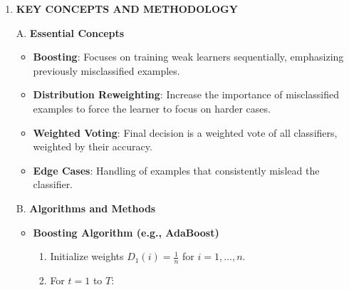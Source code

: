 \documentclass[
  12pt,
]{report}
\providecommand{\tightlist}{%
  \setlength{\itemsep}{0pt}\setlength{\parskip}{0pt}}
\begin{document}
\begin{enumerate}
\begin{itemize}
    \begin{itemize}
    \tightlist
    \item
      \textbf{Error Weighting}: Adjusting distribution \(D_t(x_i) = \frac{D_{t-1}(x_i) \cdot e^{-\alpha_t \cdot y_i \cdot h_t(x_i)}}{Z_t}\), where \(\alpha_t = \frac{1}{2} \ln\left(\frac{1-\epsilon_t}{\epsilon_t}\right)\).
    \end{itemize}
  \item
    \textbf{Theoretical Constraints and Assumptions}

    \begin{itemize}
    \tightlist
    \item
      Assumes access to a weak learner.
    \item
      Assumes binary classification with labels \(\{-1, +1\}\).
    \end{itemize}
  \end{itemize}
\item
  \textbf{KEY CONCEPTS AND METHODOLOGY}

  A. \textbf{Essential Concepts}

  \begin{itemize}
  \tightlist
  \item
    \textbf{Boosting}: Focuses on training weak learners sequentially, emphasizing previously misclassified examples.
  \item
    \textbf{Distribution Reweighting}: Increase the importance of misclassified examples to force the learner to focus on harder cases.
  \item
    \textbf{Weighted Voting}: Final decision is a weighted vote of all classifiers, weighted by their accuracy.
  \item
    \textbf{Edge Cases}: Handling of examples that consistently mislead the classifier.
  \end{itemize}

  B. \textbf{Algorithms and Methods}

  \begin{itemize}
  \tightlist
  \item
    \textbf{Boosting Algorithm (e.g., AdaBoost)}

    \begin{enumerate}
    \def\labelenumii{\arabic{enumii}.}
    \tightlist
    \item
      Initialize weights \(D_1(i) = \frac{1}{n}\) for \(i = 1, \ldots, n\).
    \item
      For \(t = 1\) to \(T\):


\end{enumerate}
\end{itemize}
\end{enumerate}
\end{document}

